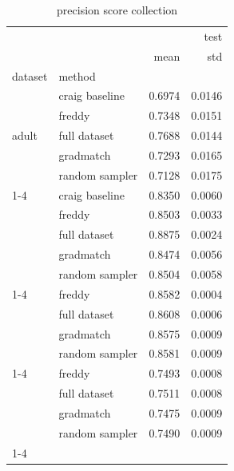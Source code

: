 \begin{table}
\caption{precision score collection}
\centering
\begin{tabular}{llrr}
\toprule
 &  & \multicolumn{2}{r}{test} \\
 &  & mean & std \\
dataset & method &  &  \\
\midrule
\multirow[t]{5}{*}{adult} & craig baseline & 0.6974 & 0.0146 \\
 & freddy & 0.7348 & 0.0151 \\
 & full dataset & 0.7688 & 0.0144 \\
 & gradmatch & 0.7293 & 0.0165 \\
 & random sampler & 0.7128 & 0.0175 \\
\cline{1-4}
\multirow[t]{5}{*}{covtype} & craig baseline & 0.8350 & 0.0060 \\
 & freddy & 0.8503 & 0.0033 \\
 & full dataset & 0.8875 & 0.0024 \\
 & gradmatch & 0.8474 & 0.0056 \\
 & random sampler & 0.8504 & 0.0058 \\
\cline{1-4}
\multirow[t]{4}{*}{hepmass} & freddy & 0.8582 & 0.0004 \\
 & full dataset & 0.8608 & 0.0006 \\
 & gradmatch & 0.8575 & 0.0009 \\
 & random sampler & 0.8581 & 0.0009 \\
\cline{1-4}
\multirow[t]{4}{*}{higgs} & freddy & 0.7493 & 0.0008 \\
 & full dataset & 0.7511 & 0.0008 \\
 & gradmatch & 0.7475 & 0.0009 \\
 & random sampler & 0.7490 & 0.0009 \\
\cline{1-4}
\bottomrule
\end{tabular}
\end{table}
